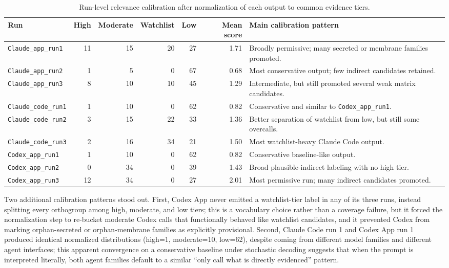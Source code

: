 \documentclass[11pt]{article}
\newcommand{\runname}[1]{\texttt{#1}}
\begin{document}
\begin{table}[ht]
\centering
\small
\caption{Run-level relevance calibration after normalization of each output to common evidence tiers.}
\label{tab:runs}
\begin{tabularx}{\linewidth}{lrrrrrY}
\toprule
Run & High & Moderate & Watchlist & Low & Mean score & Main calibration pattern\\
\midrule
\runname{Claude\_app\_run1} & 11 & 15 & 20 & 27 & 1.71 & Broadly permissive; many secreted or membrane families promoted.\\
\runname{Claude\_app\_run2} & 1 & 5 & 0 & 67 & 0.68 & Most conservative output; few indirect candidates retained.\\
\runname{Claude\_app\_run3} & 8 & 10 & 10 & 45 & 1.29 & Intermediate, but still promoted several weak matrix candidates.\\
\runname{Claude\_code\_run1} & 1 & 10 & 0 & 62 & 0.82 & Conservative and similar to \runname{Codex\_app\_run1}.\\
\runname{Claude\_code\_run2} & 3 & 15 & 22 & 33 & 1.36 & Better separation of watchlist from low, but still some overcalls.\\
\runname{Claude\_code\_run3} & 2 & 16 & 34 & 21 & 1.50 & Most watchlist-heavy Claude Code output.\\
\runname{Codex\_app\_run1} & 1 & 10 & 0 & 62 & 0.82 & Conservative baseline-like output.\\
\runname{Codex\_app\_run2} & 0 & 34 & 0 & 39 & 1.43 & Broad plausible-indirect labeling with no high tier.\\
\runname{Codex\_app\_run3} & 12 & 34 & 0 & 27 & 2.01 & Most permissive run; many indirect candidates promoted.\\
\bottomrule
\end{tabularx}
\end{table}

Two additional calibration patterns stood out. First, Codex App never emitted a watchlist-tier label in any of its three runs, instead splitting every orthogroup among high, moderate, and low tiers; this is a vocabulary choice rather than a coverage failure, but it forced the normalization step to re-bucket moderate Codex calls that functionally behaved like watchlist candidates, and it prevented Codex from marking orphan-secreted or orphan-membrane families as explicitly provisional. Second, Claude Code run 1 and Codex App run 1 produced identical normalized distributions (high=1, moderate=10, low=62), despite coming from different model families and different agent interfaces; this apparent convergence on a conservative baseline under stochastic decoding suggests that when the prompt is interpreted literally, both agent families default to a similar ``only call what is directly evidenced'' pattern.
\end{document}
